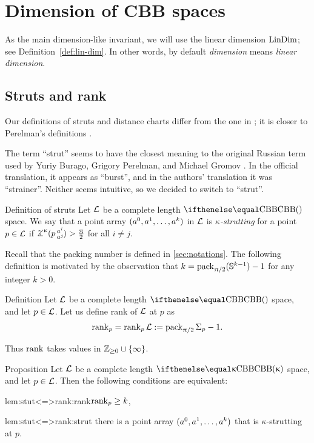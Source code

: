 \chapter{Dimension of CBB spaces}

As the main dimension-like invariant, we will use the linear dimension $\mathop{\rm LinDim}\nolimits$; 
see Definition~\ref{def:lin-dim}. In other words, by default {}\emph{dimension} means {}\emph{linear dimension}. 

\section{Struts and rank}\label{sec:struts+rank}

Our definitions of struts 
and distance charts 
differ from the one in \cite{burago-gromov-perelman};
it is closer to Perelman's definitions \cite{perelman:spaces2,perelman:morse}.

The term ``strut'' seems to have the closest meaning to the original Russian term used by Yuriy Burago, Grigory Perelman, and Michael Gromov \cite{burago-gromov-perelman}.
In the official translation,
it appears as ``burst'', 
and in the authors' translation it was ``strainer''.
Neither seems intuitive, 
so we decided to switch to ``strut''.

\begin{thm}{Definition of struts}\label{def:strut-I}
Let $\mathcal{L}$ be a complete length $\Alex{}$ space.
We say that a point array $(a^0,a^1,\dots,a^\kay)$ in $\mathcal{L}$
 is \emph{$\kappa$-strutting} for a point $p\in\spc{L}$ if $\angk\kappa p {a^i}{a^j}>\tfrac\pi2$ for all $i\ne j$.
\end{thm} 

Recall that the packing number is defined in \ref{sec:notations}.
The following definition is motivated by the observation that $k\z=\pack_{\pi/2}(\SS^{k-1})-1$ for any integer $k>0$. 

\begin{thm}{Definition}\label{def:rank}
Let $\mathcal{L}$ be a complete length $\Alex{}$ space,
and let $p\in \spc{L}$.
Let us define rank of $\mathcal{L}$ at $p$ as 
\[\mathop{\rm rank}\nolimits_p=\mathop{\rm rank}\nolimits_p\mathcal{L}
:=
\mathop{\rm pack}\nolimits_{\uppi/2}\Sigma_p-1.\]

\end{thm}

Thus $\mathop{\rm rank}\nolimits$ takes values in $\ZZ_{\ge0}\cup\{\infty\}$.

\begin{thm}{Proposition}\label{prop:stutt}
Let $\mathcal{L}$ be a complete length $\Alex{\kappa}$ space, and let $p\in \spc{L}$.
Then the following conditions are equivalent:

\begin{subthm}{lem:stut<=>rank:rank}$\rank_p\ge\kay$,
\end{subthm}

\begin{subthm}{lem:stut<=>rank:strut}
there is a point array $(a^0,a^1,\dots,a^\kay)$
that is $\kappa$-strutting at $p$. 
\end{subthm}
\end{thm}

